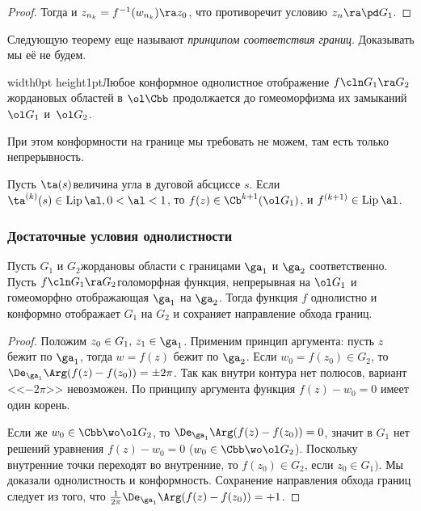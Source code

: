 \documentclass[a4paper]{article}
\def\marksign{$\maltese$}
\newcommand{\markr}{\vrule width0pt height1pt\vadjust{\vbox to 0pt{\vss\hbox to \textwidth{\hfil\raise.1pc\hbox to 0pt{\hskip.75em\marksign\hss}}}}}
\DeclareMathOperator{\Lip}{Lip}
\begin{document}
\begin{theorem}
\begin{proof}
Тогда и $z_{n_k}=f^{-1}(w_{n_k})\ra z_0$, что противоречит условию $z_n \ra \pd G_1$.
\end{proof}

Следующую теорему еще называют \emph{принципом соответствия границ}. Доказывать мы её не будем.
\begin{theorem}[Каратеодори]
\markr Любое конформное однолистное отображение $f\cln G_1\ra G_2$\т жордановых областей в $\ol \Cbb$
продолжается до гомеоморфизма их замыканий $\ol G_1$ и~$\ol G_2$.
\end{theorem}

\begin{note}
При этом конформности на границе мы требовать не можем, там есть только непрерывность.
\end{note}

\begin{theorem}[Кэллог]
 Пусть $\ta (s)$\т величина угла в дуговой абсциссе $s$.
Если $\ta^{(k)}(s)\in \Lip \al,  0<\al<1$, то $f(z)\in \Cb^{k+1}(\ol G_1)$, и $f^{(k+1)}\in \Lip \al$.
\end{theorem}

\subsubsection{Достаточные условия однолистности}

\begin{theorem}
Пусть $G_1$ и $G_2$\т жордановы области с границами $\ga_1$ и $\ga_2$ соответственно. Пусть
$f\cln G_1\ra G_2$\т голоморфная функция, непрерывная на $\ol G_1$ и гомеоморфно отображающая $\ga_1$ на $\ga_2$.
Тогда функция $f$ однолистно и конформно отображает $G_1$ на $G_2$ и сохраняет направление обхода границ.
\end{theorem}
\begin{proof}
Положим $z_0\in G_1,\, z_1\in \ga_1$. Применим принцип аргумента: пусть $z$ бежит по $\ga_1$, тогда $w=f(z)$
бежит по $\ga_2$. Если $w_0=f(z_0)\in G_2$, то $\De_{\ga_1}\Arg(f(z)-f(z_0))=\pm 2 \pi$. Так как внутри контура
нет полюсов, вариант <<$-2\pi$>> невозможен. По принципу аргумента функция $f(z)-w_0=0$ имеет один корень.

Если же $w_0\in \Cbb\wo\ol G_2$, то $\De_{\ga_1}\Arg(f(z)-f(z_0))=0$, значит в $G_1$ нет решений уравнения
$f(z)-w_0=0$ ($w_0\in \Cbb\wo\ol G_2$). Поскольку внутренние точки переходят во внутренние, то $f(z_0)\in G_2$,
если $z_0\in G_1)$. Мы доказали однолистность и конформность. Сохранение направления обхода границ
следует из того, что $\frac1{2\pi}\De_{\ga_1}\Arg(f(z)-f(z_0))=+1$.
\end{proof}


\end{theorem}
\end{document}
